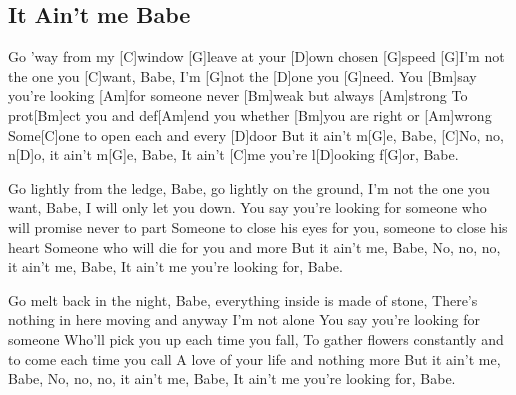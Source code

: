 \subsection*{It Ain't me Babe   }
\begin{guitar}
[G]Go 'way from my [C]window [G]leave at your [D]own chosen [G]speed
[G]I'm not the one you [C]want, Babe, I'm [G]not the [D]one you [G]need.
You [Bm]say you're looking [Am]for someone never [Bm]weak but always [Am]strong
To prot[Bm]ect you and def[Am]end you whether [Bm]you are right or [Am]wrong
Some[C]one to open each and every [D]door
But it ain't m[G]e, Babe,
[C]No, no, n[D]o, it ain't m[G]e, Babe,
It ain't [C]me you're l[D]ooking f[G]or, Babe. 



Go lightly from the ledge, Babe, go lightly on the ground,
I'm not the one you want, Babe, I will only let you down.
You say you're looking for someone 
who will promise never to part
Someone to close his eyes for you, someone to close his heart
Someone who will die for you and more 
But it ain't me, Babe,
No, no, no, it ain't me, Babe,
It ain't me you're looking for, Babe.



Go melt back in the night, Babe, 
everything inside is made of stone,
There's nothing in here moving and anyway I'm not alone
You say you're looking for someone 
Who'll pick you up each time you fall,
To gather flowers constantly and to come each time you call
A love of your life and nothing more 
But it ain't me, Babe,
No, no, no, it ain't me, Babe,
It ain't me you're looking for, Babe.

\end{guitar}
